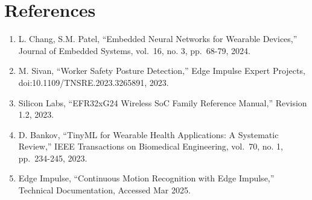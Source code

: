 \documentclass[
  9pt,
  letterpaper,
  abstract,
  titlepage]{scrbook}
\begin{document}
\section{References}\label{references-2}

\begin{enumerate}
\def\labelenumi{\arabic{enumi}.}
\item
  L. Chang, S.M. Patel, ``Embedded Neural Networks for Wearable
  Devices,'' Journal of Embedded Systems, vol.~16, no. 3, pp.~68-79,
  2024.
\item
  M. Sivan, ``Worker Safety Posture Detection,'' Edge Impulse Expert
  Projects, doi:10.1109/TNSRE.2023.3265891, 2023.
\item
  Silicon Labs, ``EFR32xG24 Wireless SoC Family Reference Manual,''
  Revision 1.2, 2023.
\item
  D. Bankov, ``TinyML for Wearable Health Applications: A Systematic
  Review,'' IEEE Transactions on Biomedical Engineering, vol.~70, no. 1,
  pp.~234-245, 2023.
\item
  Edge Impulse, ``Continuous Motion Recognition with Edge Impulse,''
  Technical Documentation, Accessed Mar 2025.
\end{enumerate}


\backmatter
\end{document}
